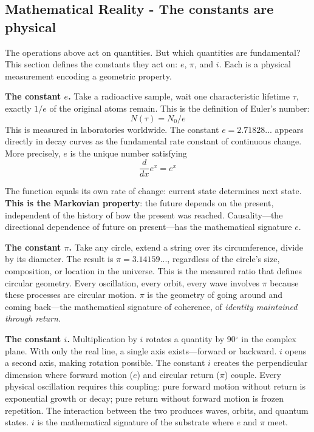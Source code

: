 \documentclass[12pt]{article}
\begin{document}
\subsection{Mathematical Reality - The constants are physical}

The operations above act on quantities. But which quantities are fundamental? This section defines the constants they act on: $e$, $\pi$, and $i$. Each is a physical measurement encoding a geometric property.

\textbf{The constant $e$.} Take a radioactive sample, wait one characteristic lifetime $\tau$, exactly $1/e$ of the original atoms remain. This is the definition of Euler's number:
\begin{equation}
N(\tau) = N_0 / e
\end{equation}
This is measured in laboratories worldwide. The constant $e = 2.71828...$ appears directly in decay curves as the fundamental rate constant of continuous change. More precisely, $e$ is the unique number satisfying
\begin{equation}
\frac{d}{dx} e^x = e^x
\end{equation}

The function equals its own rate of change: current state determines next state. \textbf{This is the Markovian property}: the future depends on the present, independent of the history of how the present was reached. Causality---the directional dependence of future on present---has the mathematical signature $e$.

\textbf{The constant $\pi$.} Take any circle, extend a string over its circumference, divide by its diameter. The result is $\pi = 3.14159...$, regardless of the circle's size, composition, or location in the universe. This is the measured ratio that defines circular geometry. Every oscillation, every orbit, every wave involves $\pi$ because these processes are circular motion. $\pi$ is the geometry of going around and coming back---the mathematical signature of coherence, of \textit{identity maintained through return.}

\textbf{The constant $i$.} Multiplication by $i$ rotates a quantity by 90$^\circ$ in the complex plane. With only the real line, a single axis exists---forward or backward. $i$ opens a second axis, making rotation possible. The constant $i$ creates the perpendicular dimension where forward motion ($e$) and circular return ($\pi$) couple. Every physical oscillation requires this coupling: pure forward motion without return is exponential growth or decay; pure return without forward motion is frozen repetition. The interaction between the two produces waves, orbits, and quantum states. $i$ is the mathematical signature of the substrate where $e$ and $\pi$ meet.
\end{document}
